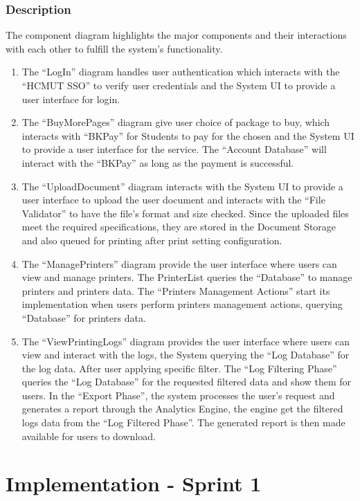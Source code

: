 \documentclass[a4paper]{report}
\begin{document}
\subsection{Description}
The component diagram highlights the major components and their interactions with each other to fulfill the system’s functionality.
\begin{enumerate}
    \item  The “LogIn” diagram handles user authentication which interacts with the “HCMUT SSO” to verify user credentials and the System UI to provide a user interface for login.
    \item The “BuyMorePages” diagram give user choice of package to buy, which interacts with “BKPay” for Students to pay for the chosen and the System UI to provide a user interface for the service. The “Account Database” will interact with the “BKPay” as long as the payment is successful.
    \item The “UploadDocument” diagram interacts with the System UI to provide a user interface to upload the user document and interacts with the “File Validator” to have the file’s format and size checked. Since the uploaded files meet the required specifications, they are stored in the Document Storage and also queued for printing after print setting configuration.
    \item The “ManagePrinters” diagram provide the user interface where users can view and manage printers. The PrinterList queries the “Database” to manage printers and printers data. The “Printers Management Actions” start its implementation when users perform printers management actions, querying “Database” for printers data.
    \item The “ViewPrintingLogs” diagram provides the user interface where users can view and interact with the logs, the System querying the “Log Database” for the log data. After user applying specific filter. The “Log Filtering Phase” queries the “Log Database” for the requested filtered data and show them for users. In the “Export Phase”, the system processes the user’s request and generates a report through the Analytics Engine, the engine get the filtered logs data from the “Log Filtered Phase”. The generated report is then made available for users to download.
\end{enumerate}

\chapter{Implementation - Sprint 1}
\end{document}
